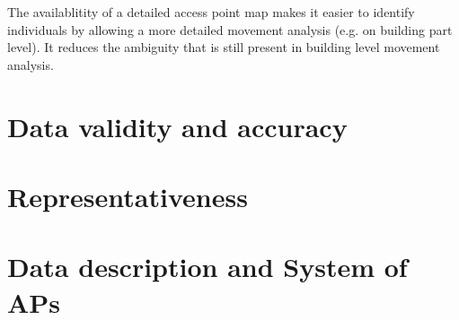 The availablitity of a detailed access point map makes it easier to identify
individuals by allowing a more detailed movement analysis (e.g. on building part
level). It reduces the ambiguity that is still present in building level
movement analysis.

\section{Data validity and accuracy}

\section{Representativeness}

\section{Data description and System of APs}\label{datadescriptionandsystemofaps}
